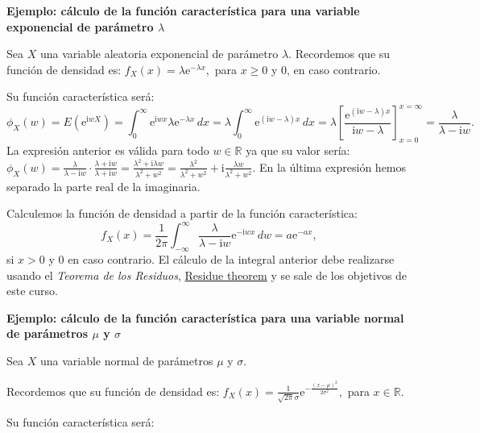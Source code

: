 \documentclass[]{book}
\begin{document}
\textbf{Ejemplo: cálculo de la función característica para una variable exponencial de parámetro \(\lambda\)}

Sea \(X\) una variable aleatoria exponencial de parámetro \(\lambda\). Recordemos que su función de densidad es: \(f_X(x)=\lambda \mathrm{e}^{-\lambda x},\) para \(x\geq 0\) y \(0\), en caso contrario.

Su función característica será:
\[
\phi_X (w)=E\left(\mathrm{e}^{\mathrm{i}wX}\right)=\int_0^\infty \mathrm{e}^{\mathrm{i}w x}\lambda \mathrm{e}^{-\lambda x}\, dx = \lambda \int_0^\infty\mathrm{e}^{(\mathrm{i}w-\lambda)x}\, dx = \lambda\left[\frac{\mathrm{e}^{(\mathrm{i}w-\lambda)x}}{\mathrm{i}w-\lambda}\right]_{x=0}^{x=\infty} = \frac{\lambda}{\lambda -\mathrm{i} w}. 
\]
La expresión anterior es válida para todo \(w\in\mathbb{R}\) ya que su valor sería:
\(\phi_X (w)=\frac{\lambda}{\lambda -\mathrm{i} w}\cdot \frac{\lambda +\mathrm{i} w}{\lambda +\mathrm{i} w}=\frac{\lambda^2+\mathrm{i}\lambda w}{\lambda^2+w^2}=\frac{\lambda^2}{\lambda^2+w^2}+\mathrm{i}\frac{\lambda w}{\lambda^2+w^2}.\)
En la última expresión hemos separado la parte real de la imaginaria.

Calculemos la función de densidad a partir de la función característica:
\[
f_X(x)=\frac{1}{2\pi}\int_{-\infty}^\infty \frac{\lambda}{\lambda -\mathrm{i} w}\mathrm{e}^{-\mathrm{i}wx}\, dw = a\mathrm{e}^{-a x},
\]
si \(x>0\) y \(0\) en caso contrario. El cálculo de la integral anterior debe realizarse usando el \emph{Teorema de los Residuos}, \href{https://en.wikipedia.org/wiki/Residue_theorem}{Residue theorem} y se sale de los objetivos de este curso.

\textbf{Ejemplo: cálculo de la función característica para una variable normal de parámetros \(\mu\) y \(\sigma\)}

Sea \(X\) una variable normal de parámetros \(\mu\) y \(\sigma\).

Recordemos que su función de densidad es: \(f_X(x)=\frac{1}{\sqrt{2\pi}\sigma}\mathrm{e}^{-\frac{(x-\mu)^2}{2\sigma^2}},\) para \(x\in \mathbb{R}\).

Su función característica será:
\end{document}
